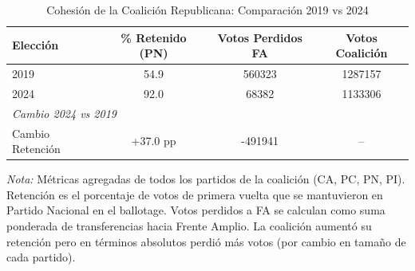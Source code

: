 \begin{table}[htbp]
\centering
\caption{Cohesión de la Coalición Republicana: Comparación 2019 vs 2024}
\label{tab:coalition_cohesion}
\small
\begin{tabular}{lccc}
\toprule
{\textbf{Elección}} & {\textbf{\% Retenido (PN)}} & {\textbf{Votos Perdidos FA}} & {\textbf{Votos Coalición}} \\
\midrule
2019 & 54.9 & 560323 & 1287157 \\
2024 & 92.0 & 68382 & 1133306 \\
\midrule
\multicolumn{4}{l}{\textit{Cambio 2024 vs 2019}} \\
Cambio Retención & +37.0 pp & -491941 & -- \\
\bottomrule
\end{tabular}
\begin{flushleft}
\small \textit{Nota:} Métricas agregadas de todos los partidos de la coalición (CA, PC, PN, PI). Retención es el porcentaje de votos de primera vuelta que se mantuvieron en Partido Nacional en el ballotage. Votos perdidos a FA se calculan como suma ponderada de transferencias hacia Frente Amplio. La coalición aumentó su retención pero en términos absolutos perdió más votos (por cambio en tamaño de cada partido).
\end{flushleft}
\end{table}
